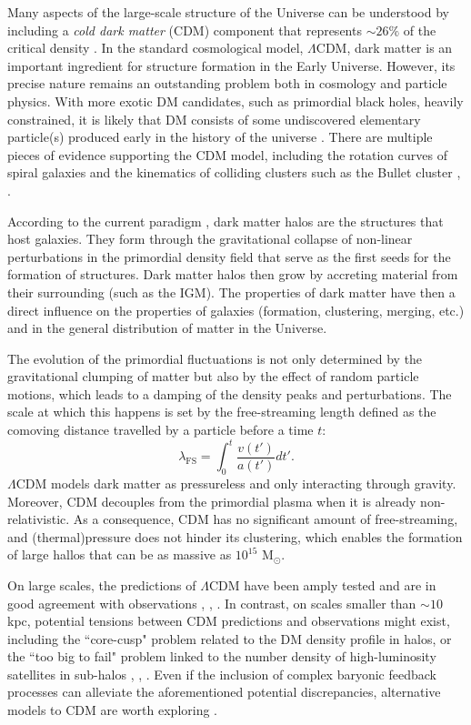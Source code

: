 Many aspects of the large-scale structure of the Universe can be understood by including a \emph{cold dark matter} (CDM) component that represents $\sim 26 \%$ of the critical density \cite{planck2014}. In the standard cosmological model, $\Lambda$CDM, dark matter is an important ingredient for structure formation in the Early Universe. However, its precise nature remains an outstanding problem both in cosmology and particle physics. With more exotic DM candidates, such as primordial black holes, heavily constrained, it is likely that DM consists of some undiscovered elementary particle(s) produced early in the history of the universe \cite{Villanueva_Domingo_2021}. There are multiple pieces of evidence supporting the CDM model, including the rotation curves of spiral galaxies and the kinematics of colliding clusters such as the Bullet cluster \cite{Navarro1996}, \cite{de_Blok_2008}.

According to the current paradigm \cite{Mo2010}, dark matter halos are the structures that host galaxies. They form through the gravitational collapse of non-linear perturbations in the primordial density field that serve as the first seeds for the formation of structures. Dark matter halos then grow by accreting material from their surrounding (such as the IGM). The properties of dark matter have then a direct influence on the properties of galaxies (formation, clustering, merging, etc.) and in the general distribution of matter in the Universe.

The evolution of the primordial fluctuations is not only determined by the gravitational clumping of matter but also by
the effect of random particle motions, which leads to a damping of the density peaks and perturbations. The scale at which this happens is set by the free-streaming length defined as the comoving distance travelled by a particle before a time $t$:
\begin{equation}
    \lambda_\mathrm{FS}=\int_0^t\frac{v(t')}{a(t')}dt'.
\end{equation}
$\Lambda$CDM models dark matter as pressureless and only interacting through gravity. Moreover, CDM decouples from the primordial plasma when it is already non-relativistic.
As a consequence, CDM has no significant amount of free-streaming, and (thermal)pressure does not hinder its clustering, which enables the formation of large hallos that can be as massive as $10^{15}$ M$_\odot$.

On large scales, the predictions of $\Lambda$CDM have been amply tested and are in good agreement with observations \cite{Dalal2002}, \cite{VanWaerbeke2004}, \cite{Eisenstein2005}. In contrast, on scales smaller than $\sim 10$ kpc, potential tensions between CDM predictions and observations might exist, including the ``core-cusp" problem related to the DM density profile in halos, or the ``too big to fail" problem linked to the number density of high-luminosity satellites in sub-halos \cite{Moore1994}, \cite{Boylan_Kolchin_2011}, \cite{Weinberg_2015}. Even if the inclusion of complex baryonic feedback processes can alleviate the aforementioned potential discrepancies, alternative models to CDM are worth exploring \cite{Vogelsberger2014}.  

